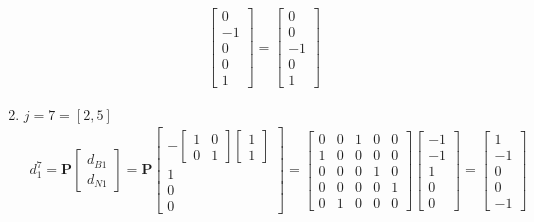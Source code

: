 \documentclass[11pt]{article}
\begin{document}
\begin{enumerate}
\begin{align*}
      \begin{bmatrix}
        0 \\ -1 \\ 0 \\ 0 \\ 1
      \end{bmatrix}
      =
      \begin{bmatrix}
        0 \\ 0 \\ -1 \\ 0 \\ 1
      \end{bmatrix}
    \end{align*}
    \item $j=7 = [2,5]$
    \begin{align*}
        d_1^7 = \textbf{P}
      \begin{bmatrix}
         d_{B1} \\ d_{N1}
      \end{bmatrix}
      =
      \textbf{P}
      \begin{bmatrix}
        -
        \begin{bmatrix}
         1 & 0 \\ 0 & 1   
        \end{bmatrix}
        \begin{bmatrix}
            1 \\ 1
        \end{bmatrix} \\
        1 \\ 0 \\ 0
      \end{bmatrix}
      = 
      \begin{bmatrix}
        0 & 0 & 1 & 0 & 0 \\
        1 & 0 & 0 & 0 & 0 \\
        0 & 0 & 0 & 1 & 0 \\
        0 & 0 & 0 & 0 & 1 \\
        0 & 1 & 0 & 0 & 0
      \end{bmatrix}
      \begin{bmatrix}
        -1 \\ -1 \\ 1 \\ 0 \\ 0
      \end{bmatrix}
      =
      \begin{bmatrix}
        1 \\ -1 \\ 0 \\ 0 \\ -1

\end{bmatrix}
\end{align*}
\end{enumerate}
\end{document}
